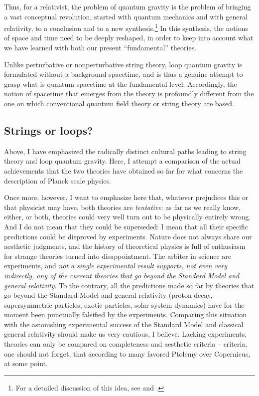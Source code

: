 Thus, for a relativist, the problem of quantum gravity is the 
problem of bringing a vast conceptual revolution, started with 
quantum mechanics and with general relativity, to a conclusion 
and to a new synthesis.\footnote{For a detailed discussion of 
this idea, see \cite{RovelliHalf} and \cite{SmolinBook}.} In this 
synthesis, the notions of space and time need to be deeply 
reshaped, in order to keep into account what we have learned with 
both our present ``fundamental'' theories.

Unlike perturbative or nonperturbative string theory, loop 
quantum gravity is formulated without a background spacetime, and 
is thus a genuine attempt to grasp what is quantum spacetime at 
the fundamental level.  Accordingly, the notion of spacetime that 
emerges from the theory is profoundly different from the one on 
which conventional quantum field theory or string theory are 
based.

\subsection{Strings or loops?} \label{strings}

Above, I have emphasized the radically distinct cultural paths leading 
to string theory and loop quantum gravity.  Here, I attempt a 
comparison of the actual achievements that the two theories have 
obtained so far for what concerns the description of Planck scale 
physics.

Once more, however, I want to emphasize here that, whatever prejudices 
this or that physicist may have, both theories are {\em tentative\/}: 
as far as we really know, either, or both, theories could very well 
turn out to be physically entirely wrong.  And I do not mean that they 
could be superseded: I mean that all their specific predictions could 
be disproved by experiments.  Nature does not always share our 
aesthetic judgments, and the history of theoretical physics is full of 
enthusiasm for strange theories turned into disappointment.  The 
arbiter in science are experiments, and {\em not a single experimental 
result supports, not even very indirectly, any of the current theories 
that go beyond the Standard Model and general relativity}.  To the 
contrary, all the predictions made so far by theories that go beyond 
the Standard Model and general relativity (proton decay, 
supersymmetric particles, exotic particles, solar system dynamics) 
have for the moment been punctually falsified by the experiments.  
Comparing this situation with the astonishing experimental success of 
the Standard Model and classical general relativity should make us 
very cautious, I believe.  Lacking experiments, theories can only be 
compared on completeness and aesthetic criteria -- criteria, one 
should not forget, that according to many favored Ptolemy over 
Copernicus, at some point.

